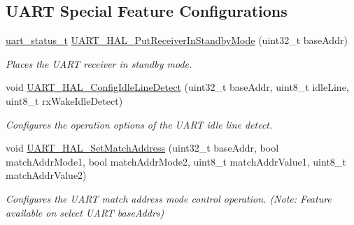 \subsection*{U\+A\+RT Special Feature Configurations}
\begin{DoxyCompactItemize}
\item 
\hyperlink{group__uart__hal_ga90effa380d181d660c1bb449977e1535}{uart\+\_\+status\+\_\+t} \hyperlink{group__uart__hal_ga9f78ab8fe20466848ff113a7c2e93917}{U\+A\+R\+T\+\_\+\+H\+A\+L\+\_\+\+Put\+Receiver\+In\+Standby\+Mode} (uint32\+\_\+t base\+Addr)
\begin{DoxyCompactList}\small\item\em Places the U\+A\+RT receiver in standby mode. \end{DoxyCompactList}\item 
void \hyperlink{group__uart__hal_ga842ee6d63065f5759a271eb9aa46f541}{U\+A\+R\+T\+\_\+\+H\+A\+L\+\_\+\+Config\+Idle\+Line\+Detect} (uint32\+\_\+t base\+Addr, uint8\+\_\+t idle\+Line, uint8\+\_\+t rx\+Wake\+Idle\+Detect)
\begin{DoxyCompactList}\small\item\em Configures the operation options of the U\+A\+RT idle line detect. \end{DoxyCompactList}\item 
void \hyperlink{group__uart__hal_ga5c80cdf69921c8d4e93953057eb3f551}{U\+A\+R\+T\+\_\+\+H\+A\+L\+\_\+\+Set\+Match\+Address} (uint32\+\_\+t base\+Addr, bool match\+Addr\+Mode1, bool match\+Addr\+Mode2, uint8\+\_\+t match\+Addr\+Value1, uint8\+\_\+t match\+Addr\+Value2)
\begin{DoxyCompactList}\small\item\em Configures the U\+A\+RT match address mode control operation. (Note\+: Feature available on select U\+A\+RT base\+Addrs) \end{DoxyCompactList}\end{DoxyCompactItemize}

